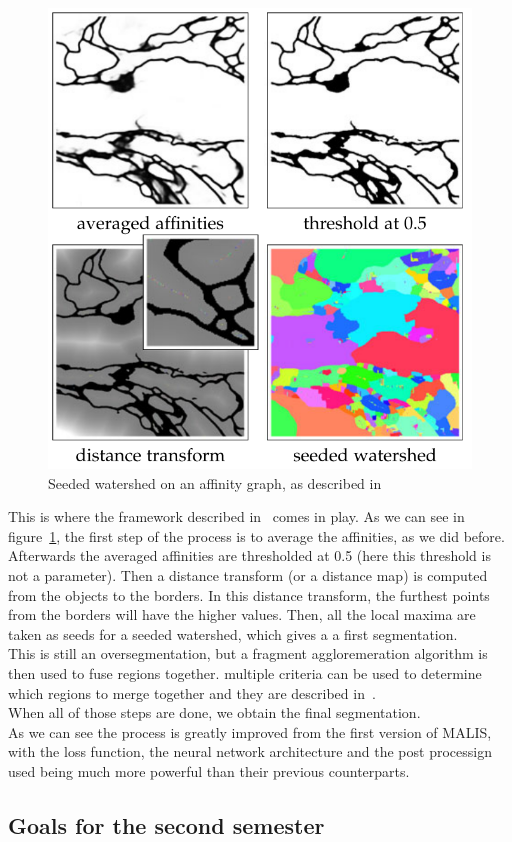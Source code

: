 \begin{figure}[!htbp]
	\centering
	\includegraphics[width=0.5\linewidth]{./images/mala_post_proc.png}
	\caption{Seeded watershed on an affinity graph, as described in~\cite{funke_large_2019}}%
	\label{fig:seeded_ws}
\end{figure}

This is where the framework described in~\cite{funke_large_2019} comes in play.
As we can see in figure~\ref{fig:seeded_ws}, the first step of the process is
to average the affinities, as we did before. Afterwards the averaged affinities
are thresholded at 0.5 (here this threshold is not a parameter). Then a
distance transform (or a distance map) is computed from the objects to the
borders. In this distance transform, the furthest points from the borders will
have the higher values. Then, all the local maxima are taken as seeds for a
seeded watershed, which gives a a first segmentation.\\

This is still an oversegmentation, but a fragment aggloremeration algorithm is
then used to fuse regions together. multiple criteria can be used to
determine which regions to merge together and they are described
in~\cite{funke_large_2019}.\\
When all of those steps are done, we obtain the final segmentation.\\

As we can see the process is greatly improved from the first version of MALIS,
with the loss function, the neural network architecture and the post processign
used being much more powerful than their previous counterparts.

\subsection{Goals for the second semester}

